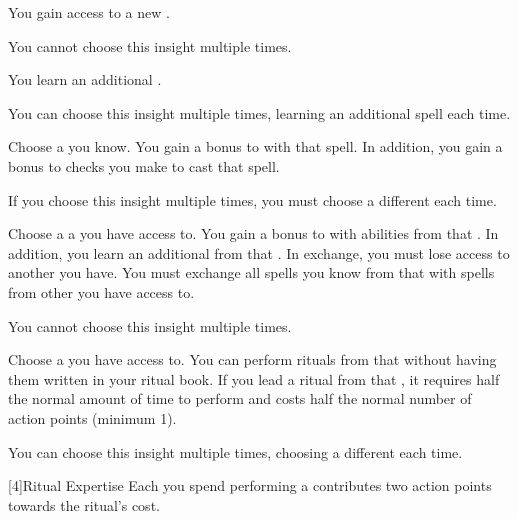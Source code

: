         {
             You gain access to a new .
            \par You cannot choose this insight multiple times.

             You learn an additional .
            \par You can choose this insight multiple times, learning an additional spell each time.

             Choose a  you know.
            You gain a  bonus to  with that spell.
            In addition, you gain a  bonus to  checks you make to cast that spell.
            \par If you choose this insight multiple times, you must choose a different  each time.

             Choose a a  you have access to.
            You gain a  bonus to  with abilities from that .
            In addition, you learn an additional  from that .
            In exchange, you must lose access to another  you have.
            You must exchange all spells you know from that  with spells from other  you have access to.
            \par You cannot choose this insight multiple times.

            Choose a  you have access to.
            You can perform rituals from that  without having them written in your ritual book.
            If you lead a ritual from that , it requires half the normal amount of time to perform and costs half the normal number of action points (minimum 1).
            \par You can choose this insight multiple times, choosing a different  each time.
        }

        [4]{Ritual Expertise} Each  you spend performing a  contributes two action points towards the ritual's cost.



